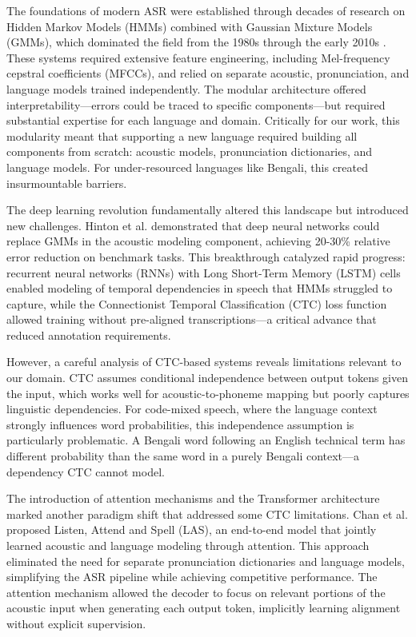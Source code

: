 The foundations of modern ASR were established through decades of research on Hidden Markov Models (HMMs) combined with Gaussian Mixture Models (GMMs), which dominated the field from the 1980s through the early 2010s \cite{Rabiner1989, Juang1991}. These systems required extensive feature engineering, including Mel-frequency cepstral coefficients (MFCCs), and relied on separate acoustic, pronunciation, and language models trained independently. The modular architecture offered interpretability---errors could be traced to specific components---but required substantial expertise for each language and domain. Critically for our work, this modularity meant that supporting a new language required building all components from scratch: acoustic models, pronunciation dictionaries, and language models. For under-resourced languages like Bengali, this created insurmountable barriers.

The deep learning revolution fundamentally altered this landscape but introduced new challenges. Hinton et al. \cite{Hinton2012} demonstrated that deep neural networks could replace GMMs in the acoustic modeling component, achieving 20-30\% relative error reduction on benchmark tasks. This breakthrough catalyzed rapid progress: recurrent neural networks (RNNs) with Long Short-Term Memory (LSTM) cells \cite{Hochreiter1997} enabled modeling of temporal dependencies in speech that HMMs struggled to capture, while the Connectionist Temporal Classification (CTC) loss function \cite{Graves2006} allowed training without pre-aligned transcriptions---a critical advance that reduced annotation requirements.

However, a careful analysis of CTC-based systems reveals limitations relevant to our domain. CTC assumes conditional independence between output tokens given the input, which works well for acoustic-to-phoneme mapping but poorly captures linguistic dependencies. For code-mixed speech, where the language context strongly influences word probabilities, this independence assumption is particularly problematic. A Bengali word following an English technical term has different probability than the same word in a purely Bengali context---a dependency CTC cannot model.

The introduction of attention mechanisms \cite{Bahdanau2015} and the Transformer architecture \cite{Vaswani2017} marked another paradigm shift that addressed some CTC limitations. Chan et al. \cite{Chan2016} proposed Listen, Attend and Spell (LAS), an end-to-end model that jointly learned acoustic and language modeling through attention. This approach eliminated the need for separate pronunciation dictionaries and language models, simplifying the ASR pipeline while achieving competitive performance. The attention mechanism allowed the decoder to focus on relevant portions of the acoustic input when generating each output token, implicitly learning alignment without explicit supervision.

